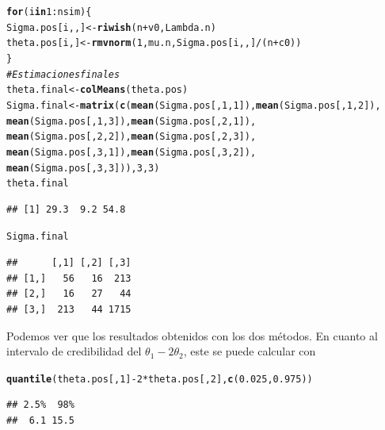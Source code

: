 \documentclass[10pt,openright]{book}\usepackage[]{graphicx}\usepackage[]{color}
\makeatletter
\newcommand{\hlnum}[1]{\textcolor[rgb]{0.686,0.059,0.569}{#1}}%
\newcommand{\hlcom}[1]{\textcolor[rgb]{0.678,0.584,0.686}{\textit{#1}}}%
\newcommand{\hlopt}[1]{\textcolor[rgb]{0,0,0}{#1}}%
\newcommand{\hlstd}[1]{\textcolor[rgb]{0.345,0.345,0.345}{#1}}%
\newcommand{\hlkwa}[1]{\textcolor[rgb]{0.161,0.373,0.58}{\textbf{#1}}}%
\newcommand{\hlkwb}[1]{\textcolor[rgb]{0.69,0.353,0.396}{#1}}%
\newcommand{\hlkwd}[1]{\textcolor[rgb]{0.737,0.353,0.396}{\textbf{#1}}}%
\newenvironment{kframe}{%
 \def\at@end@of@kframe{}%
 \ifinner\ifhmode%
  \def\at@end@of@kframe{\end{minipage}}%
  \begin{minipage}{\columnwidth}%
 \fi\fi%
 \def\FrameCommand##1{\hskip\@totalleftmargin \hskip-\fboxsep
 \colorbox{shadecolor}{##1}\hskip-\fboxsep
     \hskip-\linewidth \hskip-\@totalleftmargin \hskip\columnwidth}%
 \MakeFramed {\advance\hsize-\width
   \@totalleftmargin\z@ \linewidth\hsize
   \@setminipage}}%
 {\par\unskip\endMakeFramed%
 \at@end@of@kframe}
\newenvironment{knitrout}{}{} %
\makeatother
\begin{document}
\begin{Eje}
\begin{knitrout}
\begin{kframe}
\begin{alltt}
\hlkwa{for}\hlstd{(i} \hlkwa{in} \hlnum{1}\hlopt{:}\hlstd{nsim)\{}
  \hlstd{Sigma.pos[i,,]} \hlkwb{<-} \hlkwd{riwish}\hlstd{(n}\hlopt{+}\hlstd{v0, Lambda.n)}
  \hlstd{theta.pos[i,]} \hlkwb{<-} \hlkwd{rmvnorm}\hlstd{(}\hlnum{1}\hlstd{, mu.n, Sigma.pos[i,,]}\hlopt{/}\hlstd{(n}\hlopt{+}\hlstd{c0))}
\hlstd{\}}
\hlcom{# Estimaciones finales}
\hlstd{theta.final} \hlkwb{<-} \hlkwd{colMeans}\hlstd{(theta.pos)}
\hlstd{Sigma.final} \hlkwb{<-} \hlkwd{matrix}\hlstd{(}\hlkwd{c}\hlstd{(}\hlkwd{mean}\hlstd{(Sigma.pos[,}\hlnum{1}\hlstd{,}\hlnum{1}\hlstd{]),}\hlkwd{mean}\hlstd{(Sigma.pos[,}\hlnum{1}\hlstd{,}\hlnum{2}\hlstd{]),}
                        \hlkwd{mean}\hlstd{(Sigma.pos[,}\hlnum{1}\hlstd{,}\hlnum{3}\hlstd{]),} \hlkwd{mean}\hlstd{(Sigma.pos[,}\hlnum{2}\hlstd{,}\hlnum{1}\hlstd{]),}
                        \hlkwd{mean}\hlstd{(Sigma.pos[,}\hlnum{2}\hlstd{,}\hlnum{2}\hlstd{]),} \hlkwd{mean}\hlstd{(Sigma.pos[,}\hlnum{2}\hlstd{,}\hlnum{3}\hlstd{]),}
                        \hlkwd{mean}\hlstd{(Sigma.pos[,}\hlnum{3}\hlstd{,}\hlnum{1}\hlstd{]),}\hlkwd{mean}\hlstd{(Sigma.pos[,}\hlnum{3}\hlstd{,}\hlnum{2}\hlstd{]),}
                        \hlkwd{mean}\hlstd{(Sigma.pos[,}\hlnum{3}\hlstd{,}\hlnum{3}\hlstd{])),} \hlnum{3}\hlstd{,} \hlnum{3}\hlstd{)}
\hlstd{theta.final}
\end{alltt}
\begin{verbatim}
## [1] 29.3  9.2 54.8
\end{verbatim}
\begin{alltt}
\hlstd{Sigma.final}
\end{alltt}
\begin{verbatim}
##      [,1] [,2] [,3]
## [1,]   56   16  213
## [2,]   16   27   44
## [3,]  213   44 1715
\end{verbatim}
\end{kframe}
\end{knitrout}
Podemos ver que los resultados obtenidos con los dos m\'etodos. En cuanto al intervalo de credibilidad del $\theta_1-2\theta_2$, este se puede calcular con
\begin{knitrout}
\color{fgcolor}\begin{kframe}
\begin{alltt}
\hlkwd{quantile}\hlstd{(theta.pos[,}\hlnum{1}\hlstd{]}\hlopt{-}\hlnum{2}\hlopt{*}\hlstd{theta.pos[,}\hlnum{2}\hlstd{],} \hlkwd{c}\hlstd{(}\hlnum{0.025}\hlstd{,} \hlnum{0.975}\hlstd{))}
\end{alltt}
\begin{verbatim}
## 2.5%  98% 
##  6.1 15.5

\end{verbatim}
\end{kframe}
\end{knitrout}
\end{Eje}
\end{document}
